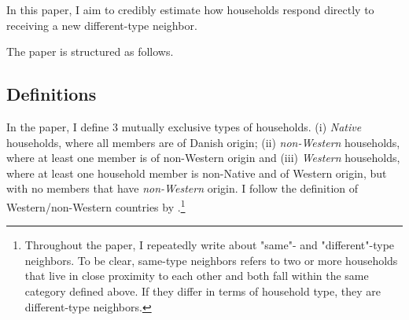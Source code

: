 \documentclass[../main.tex]{subfiles}
\begin{document}
In this paper, I aim to credibly estimate how households respond directly to receiving a new different-type neighbor.


The paper is structured as follows. 

\subsection{Definitions}
\label{sec:intro_definitions}
In the paper, I define 3 mutually exclusive types of households. (i) \textit{Native} households, where all members are of Danish origin; (ii) \textit{non-Western} households, where at least one member is of non-Western origin and (iii) \textit{Western} households, where at least one household member is non-Native and of Western origin, but with no members that have \textit{non-Western} origin. I follow the definition of Western/non-Western countries by \textcite{west_non_west_def_dst}.\footnote{Throughout the paper, I repeatedly write about "same"- and "different"-type neighbors. To be clear, same-type neighbors refers to two or more households that live in close proximity to each other and both fall within the same category defined above. If they differ in terms of household type, they are different-type neighbors.}
\end{document}
